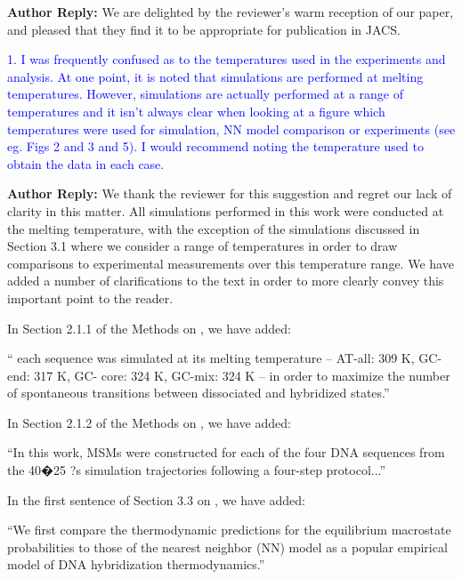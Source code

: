 \documentclass[11pt,a4paper]{letter} %
\newcommand*{\rood}[1]{{\color{red}{#1}}}
\begin{document}
\textbf{Author Reply:}   We are delighted by the reviewer's warm reception of our paper, and pleased that they find it to be appropriate for publication in JACS.




\textcolor{blue}{1.   I was frequently confused as to the temperatures used in the experiments and analysis. At one point, it is noted that simulations are performed at melting temperatures. However, simulations are actually performed at a range of temperatures and it isn't always clear when looking at a figure which temperatures were used for simulation, NN model comparison or experiments (see eg. Figs 2 and 3 and 5). I would recommend noting the temperature used to obtain the data in each case.}

\textbf{Author Reply:}   We thank the reviewer for this suggestion and regret our lack of clarity in this matter. All simulations performed in this work were conducted at the melting temperature, with the exception of the simulations discussed in Section 3.1 where we consider a range of temperatures in order to draw comparisons to experimental measurements over this temperature range. We have added a number of clarifications to the text in order to more clearly convey this important point to the reader.

In Section 2.1.1 of the Methods on \rood{p.~7}, we have added:

``\rood{With the exception of the simulation data reported in Section 3.1 where we draw comparisons against experimental data collected over a range of temperatures,} each sequence was simulated at its melting temperature -- AT-all: 309 K, GC-end: 317 K, GC- core: 324 K, GC-mix: 324 K -- in order to maximize the number of spontaneous transitions between dissociated and hybridized states.''

In Section 2.1.2 of the Methods on \rood{p.~8}, we have added:

``In this work, MSMs were constructed for each of the four DNA sequences \rood{at their respective melting temperatures} from the 40�25 ?s simulation trajectories following a four-step protocol...''

In the first sentence of Section 3.3 on \rood{p.~19}, we have added:

``We first compare the thermodynamic predictions for the equilibrium macrostate probabilities \rood{made by the MSM models fitted at the sequence melting temperatures} to those of the nearest neighbor (NN) model as a popular empirical model of DNA hybridization thermodynamics.''
\end{document}
